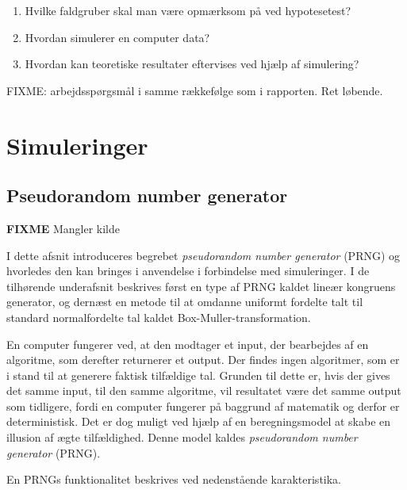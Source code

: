 \documentclass[
]{book}
\theoremstyle{definition}
\theoremstyle{definition}
\theoremstyle{definition}
\theoremstyle{remark}
\begin{document}
\begin{enumerate}
\def\labelenumi{\arabic{enumi}.}
\item
  Hvilke faldgruber skal man være opmærksom på ved hypotesetest?
\item
  Hvordan simulerer en computer data?
\item
  Hvordan kan teoretiske resultater eftervises ved hjælp af simulering?
\end{enumerate}

FIXME: arbejdsspørgsmål i samme rækkefølge som i rapporten. Ret løbende.

\hypertarget{simuleringer}{%
\chapter{Simuleringer}\label{simuleringer}}

\hypertarget{pseudorandom-number-generator}{%
\section{Pseudorandom number generator}\label{pseudorandom-number-generator}}

\textbf{FIXME} Mangler kilde

I dette afsnit introduceres begrebet \emph{pseudorandom number generator} (PRNG) og hvorledes den kan bringes i anvendelse i forbindelse med simuleringer. I de tilhørende underafsnit beskrives først en type af PRNG kaldet lineær kongruens generator, og dernæst en metode til at omdanne uniformt fordelte talt til standard normalfordelte tal kaldet Box-Muller-transformation.

En computer fungerer ved, at den modtager et input, der bearbejdes af en algoritme, som derefter returnerer et output. Der findes ingen algoritmer, som er i stand til at generere faktisk tilfældige tal. Grunden til dette er, hvis der gives det samme input, til den samme algoritme, vil resultatet være det samme output som tidligere, fordi en computer fungerer på baggrund af matematik og derfor er deterministisk. Det er dog muligt ved hjælp af en beregningsmodel at skabe en illusion af ægte tilfældighed. Denne model kaldes \emph{pseudorandom number generator} (PRNG).

En PRNGs funktionalitet beskrives ved nedenstående karakteristika.
\end{document}

